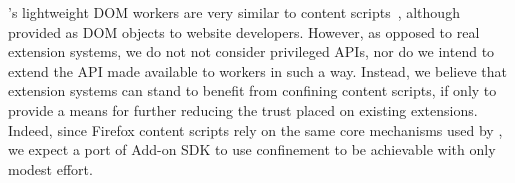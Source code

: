 %
\sys{}'s lightweight DOM workers are very similar to content
scripts~\cite{Carlini:2012}, although provided as DOM objects to
website developers.
%
However, as opposed to real extension systems, we do not not consider
privileged APIs, nor do we intend to extend the API made available to
workers in such a way.
%
Instead, we believe that extension systems can stand to benefit from
confining content scripts, if only to provide a means for further
reducing the trust placed on existing extensions.
%
Indeed, since Firefox content scripts rely on the same core mechanisms
used by \sys{}, we expect a port of Add-on SDK to use confinement to
be achievable with only modest effort.
 

